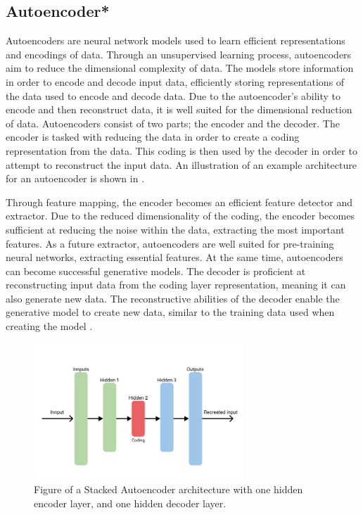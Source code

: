 
\subsection{Autoencoder*}
\label{section:B&T:Autoencoder}
Autoencoders are neural network models used to learn efficient representations and encodings of data.
Through an unsupervised learning process, autoencoders aim to reduce the dimensional complexity of data.
The models store information in order to encode and decode input data,
efficiently storing representations of the data used to encode and decode data.
Due to the autoencoder's ability to encode and then reconstruct data, it is well suited for the dimensional reduction of data.
Autoencoders consist of two parts; the encoder and the decoder.
The encoder is tasked with reducing the data in order to create a coding representation from the data.
This coding is then used by the decoder in order to attempt to reconstruct the input data.
An illustration of an example architecture for an autoencoder is shown in . 

Through feature mapping, the encoder becomes an efficient feature detector and extractor.
Due to the reduced dimensionality of the coding, the encoder becomes sufficient at reducing the noise within the data, extracting the most important features.
As a future extractor, autoencoders are well suited for pre-training neural networks, extracting essential features.
At the same time, autoencoders can become successful generative models.
The decoder is proficient at reconstructing input data from the coding layer representation, meaning it can also generate new data.
The reconstructive abilities of the decoder enable the generative model to create new data, similar to the training data used when creating the model
\cite[p.~506-508]{Geron2017}.


\begin{figure}[h!]
    \centering
    \includegraphics[width=0.7\textwidth]{./sections/BT/figures/Autoencoder.png}
    \hfill
    \caption{Figure of a Stacked Autoencoder architecture with one hidden encoder layer, and one hidden decoder layer.}
    \label{fig:stacked_autoencoder_arch}
\end{figure}




